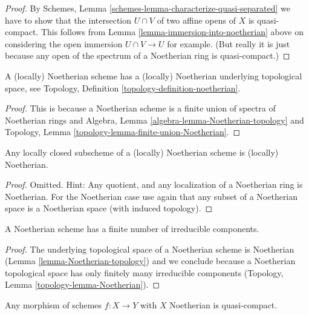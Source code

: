 \begin{proof}
By Schemes, Lemma \ref{schemes-lemma-characterize-quasi-separated}
we have to show that the intersection $U \cap V$ of two
affine opens of $X$ is quasi-compact. This follows from
Lemma \ref{lemma-immersion-into-noetherian} above on
considering the open immersion $U \cap V \to U$ for example.
(But really it is just because any open of the spectrum of a
Noetherian ring is quasi-compact.)
\end{proof}

\begin{lemma}
\label{lemma-Noetherian-topology}
A (locally) Noetherian scheme has a (locally)
Noetherian underlying topological space,
see Topology, Definition \ref{topology-definition-noetherian}.
\end{lemma}

\begin{proof}
This is because a Noetherian scheme is a finite union of spectra
of Noetherian rings and
Algebra, Lemma \ref{algebra-lemma-Noetherian-topology} and
Topology, Lemma \ref{topology-lemma-finite-union-Noetherian}.
\end{proof}

\begin{lemma}
\label{lemma-locally-closed-in-Noetherian}
Any locally closed subscheme of a (locally) Noetherian
scheme is (locally) Noetherian.
\end{lemma}

\begin{proof}
Omitted. Hint: Any quotient, and any localization of a Noetherian
ring is Noetherian. For the Noetherian case use again
that any subset of a Noetherian space is a Noetherian space
(with induced topology).
\end{proof}

\begin{lemma}
\label{lemma-Noetherian-irreducible-components}
A Noetherian scheme has a finite number of irreducible components.
\end{lemma}

\begin{proof}
The underlying topological space of a Noetherian scheme is Noetherian
(Lemma \ref{lemma-Noetherian-topology})
and we conclude because a Noetherian topological space
has only finitely many irreducible components
(Topology, Lemma \ref{topology-lemma-Noetherian}).
\end{proof}

\begin{lemma}
\label{lemma-morphism-Noetherian-schemes-quasi-compact}
Any morphism of schemes $f : X \to Y$ with $X$ Noetherian
is quasi-compact.
\end{lemma}

